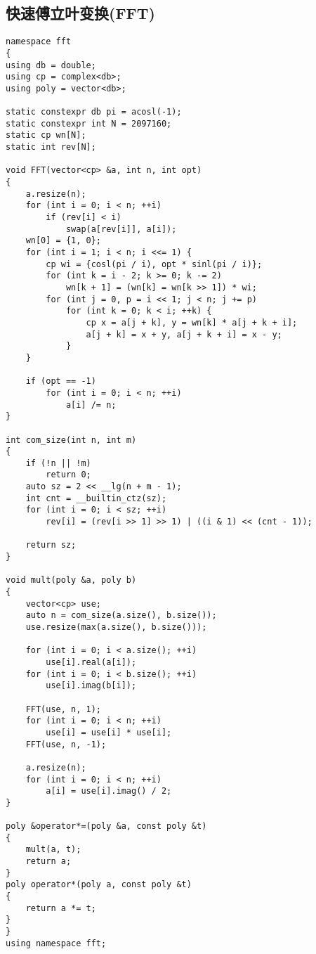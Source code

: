 \documentclass[twocolumn,a4]{article}
\begin{document}
\subsection{快速傅立叶变换(FFT)}
\begin{lstlisting}
namespace fft
{
using db = double;
using cp = complex<db>;
using poly = vector<db>;

static constexpr db pi = acosl(-1);
static constexpr int N = 2097160;
static cp wn[N];
static int rev[N];

void FFT(vector<cp> &a, int n, int opt)
{
    a.resize(n);
    for (int i = 0; i < n; ++i)
        if (rev[i] < i)
            swap(a[rev[i]], a[i]);
    wn[0] = {1, 0};
    for (int i = 1; i < n; i <<= 1) {
        cp wi = {cosl(pi / i), opt * sinl(pi / i)};
        for (int k = i - 2; k >= 0; k -= 2)
            wn[k + 1] = (wn[k] = wn[k >> 1]) * wi;
        for (int j = 0, p = i << 1; j < n; j += p)
            for (int k = 0; k < i; ++k) {
                cp x = a[j + k], y = wn[k] * a[j + k + i];
                a[j + k] = x + y, a[j + k + i] = x - y;
            }
    }

    if (opt == -1)
        for (int i = 0; i < n; ++i)
            a[i] /= n;
}

int com_size(int n, int m)
{
    if (!n || !m)
        return 0;
    auto sz = 2 << __lg(n + m - 1);
    int cnt = __builtin_ctz(sz);
    for (int i = 0; i < sz; ++i)
        rev[i] = (rev[i >> 1] >> 1) | ((i & 1) << (cnt - 1));

    return sz;
}

void mult(poly &a, poly b)
{
    vector<cp> use;
    auto n = com_size(a.size(), b.size());
    use.resize(max(a.size(), b.size()));

    for (int i = 0; i < a.size(); ++i)
        use[i].real(a[i]);
    for (int i = 0; i < b.size(); ++i)
        use[i].imag(b[i]);

    FFT(use, n, 1);
    for (int i = 0; i < n; ++i)
        use[i] = use[i] * use[i];
    FFT(use, n, -1);

    a.resize(n);
    for (int i = 0; i < n; ++i)
        a[i] = use[i].imag() / 2;
}

poly &operator*=(poly &a, const poly &t)
{
    mult(a, t);
    return a;
}
poly operator*(poly a, const poly &t)
{
    return a *= t;
}
}
using namespace fft;
\end{lstlisting}
\end{document}
